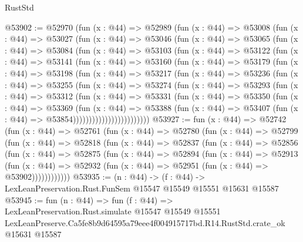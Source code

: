 \begin{lexlean}{RustStd}
\begin{coremodule}
@53902 := @52970
    (fun (x : @44) =>
    @52989
      (fun (x : @44) =>
      @53008
        (fun (x : @44) =>
        @53027
          (fun (x : @44) =>
          @53046
            (fun (x : @44) =>
            @53065
              (fun (x : @44) =>
              @53084
                (fun (x : @44) =>
                @53103
                  (fun (x : @44) =>
                  @53122
                    (fun (x : @44) =>
                    @53141
                      (fun (x : @44) =>
                      @53160
                        (fun (x : @44) =>
                        @53179
                          (fun (x : @44) =>
                          @53198
                            (fun (x : @44) =>
                            @53217
                              (fun (x : @44) =>
                              @53236
                                (fun (x : @44) =>
                                @53255
                                  (fun (x : @44) =>
                                  @53274
                                    (fun (x : @44) =>
                                    @53293
                                      (fun (x : @44) =>
                                      @53312
                                        (fun (x : @44) =>
                                        @53331
                                          (fun (x : @44) =>
                                          @53350
                                            (fun (x : @44) =>
                                            @53369
                                              (fun (x : @44) =>
                                              @53388
                                                (fun (x : @44) =>
                                                @53407
                                                  (fun (x : @44) => @53854))))))))))))))))))))))))
@53927 := fun (x : @44) =>
  @52742
    (fun (x : @44) =>
    @52761
      (fun (x : @44) =>
      @52780
        (fun (x : @44) =>
        @52799
          (fun (x : @44) =>
          @52818
            (fun (x : @44) =>
            @52837
              (fun (x : @44) =>
              @52856
                (fun (x : @44) =>
                @52875
                  (fun (x : @44) =>
                  @52894
                    (fun (x : @44) =>
                    @52913
                      (fun (x : @44) =>
                      @52932 (fun (x : @44) => @52951 (fun (x : @44) => @53902))))))))))))
@53935 := (n : @44) ->
  (f : @44) -> LexLeanPreservation.Rust.FunSem @15547 @15549 @15551 @15631 @15587
@53945 := fun (n : @44) =>
  fun (f : @44) =>
  LexLeanPreservation.Rust.simulate
    @15547
    @15549
    @15551
    LexLeanPreserve.Ca5fe8b9d64595a79eee4f004915717bd.R14.RustStd.crate_ok
    @15631
    @15587
\end{coremodule}
\end{lexlean}
